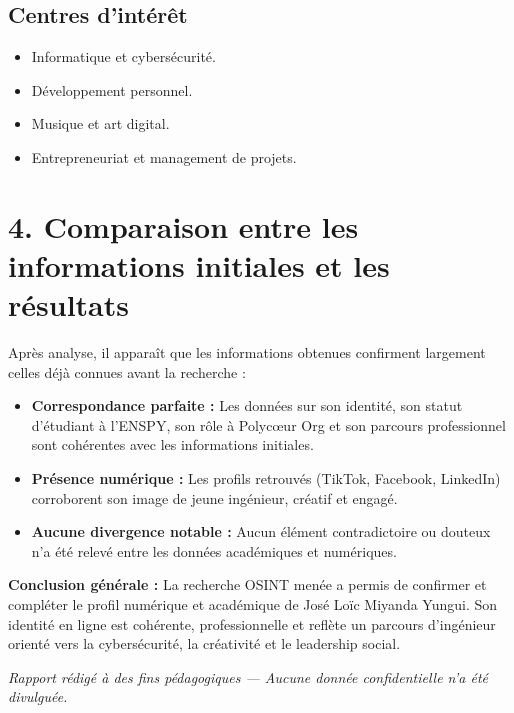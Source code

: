 \documentclass[12pt]{article}
\begin{document}
\subsection*{Centres d’intérêt}
\begin{itemize}
    \item Informatique et cybersécurité.
    \item Développement personnel.
    \item Musique et art digital.
    \item Entrepreneuriat et management de projets.
\end{itemize}

\section*{4. Comparaison entre les informations initiales et les résultats}
Après analyse, il apparaît que les informations obtenues confirment largement celles déjà connues avant la recherche :

\begin{itemize}
    \item \textbf{Correspondance parfaite :} Les données sur son identité, son statut d’étudiant à l’ENSPY, son rôle à Polycœur Org et son parcours professionnel sont cohérentes avec les informations initiales.
    \item \textbf{Présence numérique :} Les profils retrouvés (TikTok, Facebook, LinkedIn) corroborent son image de jeune ingénieur, créatif et engagé.
    \item \textbf{Aucune divergence notable :} Aucun élément contradictoire ou douteux n’a été relevé entre les données académiques et numériques.
\end{itemize}

\noindent\textbf{Conclusion générale :}  
La recherche OSINT menée a permis de confirmer et compléter le profil numérique et académique de José Loïc Miyanda Yungui. Son identité en ligne est cohérente, professionnelle et reflète un parcours d’ingénieur orienté vers la cybersécurité, la créativité et le leadership social.

\vfill
\begin{center}
\textit{Rapport rédigé à des fins pédagogiques — Aucune donnée confidentielle n’a été divulguée.}
\end{center}
\end{document}
